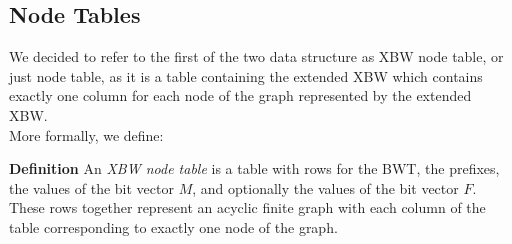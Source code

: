 \documentclass[a4paper,12pt,twoside,BCOR=10mm]{scrbook}
\begin{document}
\subsection{Node Tables}
\label{sec:node_table_definition}

We decided to refer to the first of the two data structure as XBW node table, or just node table,
as it is a
table containing the extended XBW which contains exactly one column for each
node of the graph represented by the extended XBW. \\
More formally, we define:

\textbf{Definition} An \textit{XBW node table}\label{def:node_table} is a table with rows for the BWT,
the prefixes, the values of the bit vector $ M $, and optionally the values of the bit vector $ F $.
These rows together represent an acyclic finite graph with each column of the table corresponding
to exactly one node of the graph.
\end{document}
